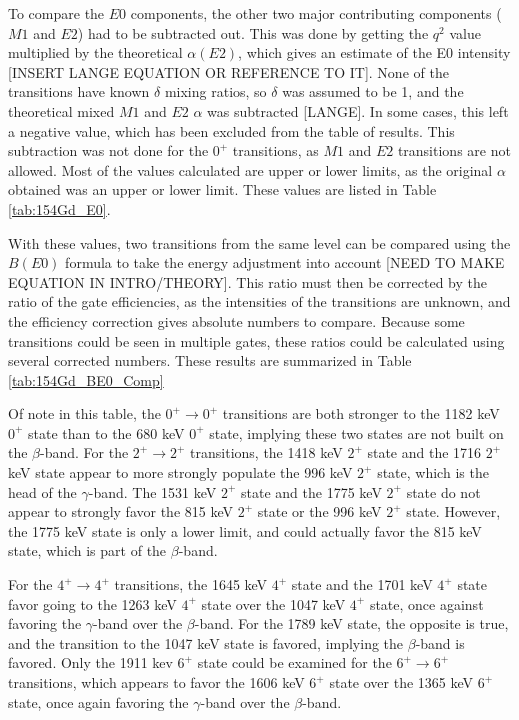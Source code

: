 To compare the $E0$ components, the other two major contributing components ($M1$ and $E2$) had to be subtracted out. This was done by getting the $q^2$ value multiplied by the theoretical $\alpha(E2)$, which gives an estimate of the E0 intensity [INSERT LANGE EQUATION OR REFERENCE TO IT]. None of the transitions have known $\delta$ mixing ratios, so $\delta$ was assumed to be 1, and the theoretical mixed $M1$ and $E2$ $\alpha$ was subtracted [LANGE]. In some cases, this left a negative value, which has been excluded from the table of results. This subtraction was not done for the $0^+$ transitions, as $M1$ and $E2$ transitions are not allowed. Most of the values calculated are upper or lower limits, as the original $\alpha$ obtained was an upper or lower limit. These values are listed in Table \ref{tab:154Gd_E0}.

With these values, two transitions from the same level can be compared using the $B(E0)$ formula to take the energy adjustment into account [NEED TO MAKE EQUATION IN INTRO/THEORY]. This ratio must then be corrected by the ratio of the gate efficiencies, as the intensities of the transitions are unknown, and the efficiency correction gives absolute numbers to compare. Because some transitions could be seen in multiple gates, these ratios could be calculated using several corrected numbers. These results are summarized in Table \ref{tab:154Gd_BE0_Comp}

\afterpage{\clearpage}

\afterpage{\clearpage}

Of note in this table, the $0^+\rightarrow0^+$ transitions are both stronger to the 1182 keV $0^+$ state than to the 680 keV $0^+$ state, implying these two states are not built on the $\beta$-band. For the $2^+\rightarrow2^+$ transitions, the 1418 keV $2^+$ state and the 1716 $2^+$ keV state appear to more strongly populate the 996 keV $2^+$ state, which is the head of the $\gamma$-band. The 1531 keV $2^+$ state and the 1775 keV $2^+$ state do not appear to strongly favor the 815 keV $2^+$ state or the 996 keV $2^+$ state. However, the 1775 keV state is only a lower limit, and could actually favor the 815 keV state, which is part of the $\beta$-band.

For the $4^+\rightarrow4^+$ transitions, the 1645 keV $4^+$ state and the 1701 keV $4^+$ state favor going to the 1263 keV $4^+$ state over the 1047 keV $4^+$ state, once against favoring the $\gamma$-band over the $\beta$-band. For the 1789 keV state, the opposite is true, and the transition to the 1047 keV state is favored, implying the $\beta$-band is favored. Only the 1911 kev $6^+$ state could be examined for the $6^+\rightarrow6^+$ transitions, which appears to favor the 1606 keV $6^+$ state over the 1365 keV $6^+$ state, once again favoring the $\gamma$-band over the $\beta$-band.

